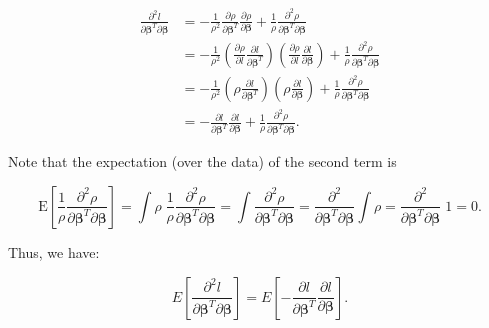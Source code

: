 \documentclass[
  12pt,
]{book}
\begin{document}
\begin{align}
  \frac{\partial^{2} l}{\partial\boldsymbol{\beta}^{T}\partial \boldsymbol{\beta}} 
  & = - \frac{1}{\rho^{2}} \frac{\partial \rho}{\partial \boldsymbol{\beta}^{T}} \frac{\partial \rho}{\partial \boldsymbol{\beta}} + \frac{1}{\rho} \frac{\partial^{2} \rho}{\partial \boldsymbol{\beta}^{T}\partial\boldsymbol{\beta}} \\
  & = - \frac{1}{\rho^{2}} \left( \frac{\partial \rho}{\partial l} \frac{\partial l}{\partial \boldsymbol{\beta}^{T}} \right) \left( \frac{\partial \rho}{\partial l} \frac{\partial l}{\partial \boldsymbol{\beta}} \right) + \frac{1}{\rho} \frac{\partial^{2} \rho}{\partial \boldsymbol{\beta}^{T}\partial\boldsymbol{\beta}} \\
  & = - \frac{1}{\rho^{2}} \left( \rho \frac{\partial l}{\partial \boldsymbol{\beta}^{T}} \right) \left( \rho \frac{\partial l}{\partial \boldsymbol{\beta}} \right) + \frac{1}{\rho} \frac{\partial^{2} \rho}{\partial \boldsymbol{\beta}^{T}\partial\boldsymbol{\beta}} \\
  & = - \frac{\partial l}{\partial \boldsymbol{\beta}^{T}} \frac{\partial l}{\partial \boldsymbol{\beta}} + \frac{1}{\rho} \frac{\partial^{2} \rho}{\partial \boldsymbol{\beta}^{T}\partial\boldsymbol{\beta}}.
\end{align}

Note that the expectation (over the data) of the second term is

\begin{equation}
  \mathrm{E} \left[ \frac{1}{\rho} \frac{\partial^{2} \rho}{\partial \boldsymbol{\beta}^{T}\partial\boldsymbol{\beta}} \right]
  = \int \rho \;\frac{1}{\rho} \frac{\partial^{2} \rho}{\partial \boldsymbol{\beta}^{T}\partial\boldsymbol{\beta}}
  = \int \frac{\partial^{2} \rho}{\partial \boldsymbol{\beta}^{T}\partial\boldsymbol{\beta}}
  = \frac{\partial^{2}}{\partial \boldsymbol{\beta}^{T}\partial\boldsymbol{\beta}} \int \rho
  = \frac{\partial^{2}}{\partial \boldsymbol{\beta}^{T}\partial\boldsymbol{\beta}} \;1
  = 0.
\end{equation}

Thus, we have:

\begin{equation}
  E \left[ \frac{\partial^{2} l}{\partial\boldsymbol{\beta}^{T}\partial\boldsymbol{\beta}} \right] 
  = E \left[ - \frac{\partial l}{\partial \boldsymbol{\beta}^{T}} \frac{\partial l}{\partial\boldsymbol{\beta}} \right].
  \label{eq:importantidentity}
\end{equation}
\end{document}

